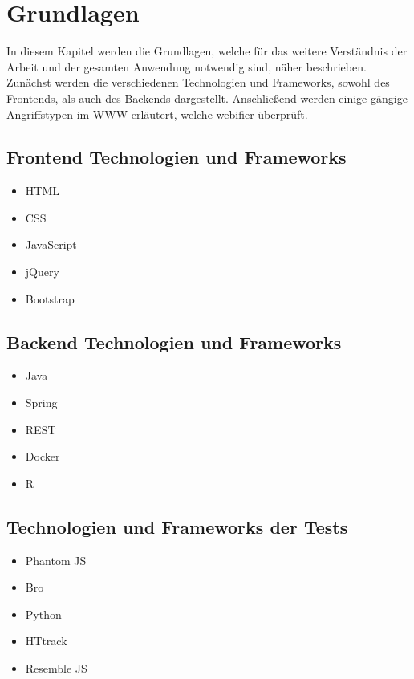 \chapter{Grundlagen}

In diesem Kapitel werden die Grundlagen, welche für das weitere Verständnis der Arbeit und der gesamten Anwendung notwendig sind, näher beschrieben. Zunächst werden die verschiedenen Technologien und Frameworks, sowohl des Frontends, als auch des Backends dargestellt. Anschließend werden einige gängige Angriffstypen im \ac{WWW} erläutert, welche webifier überprüft.

\section{Frontend Technologien und Frameworks}

\begin{itemize}
    \item HTML
    \item CSS
    \item JavaScript
    \item jQuery
    \item Bootstrap
\end{itemize}

\section{Backend Technologien und Frameworks}


\begin{itemize}
  \item Java
  \item Spring
  \item REST
  \item Docker
  \item R
\end{itemize}

\section{Technologien und Frameworks der Tests}

\begin{itemize}
    \item Phantom JS
    \item Bro
    \item Python
    \item HTtrack
    \item Resemble JS
\end{itemize}


